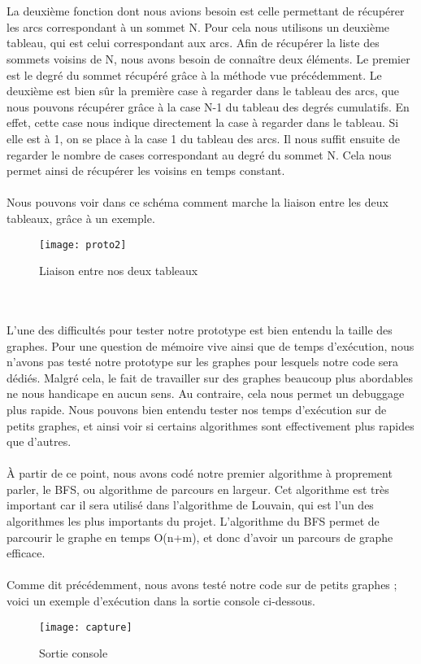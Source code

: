 \begin{titlepage}
{~\\ \\
	La deuxième fonction dont nous avions besoin est celle permettant de récupérer les arcs correspondant à un sommet N. Pour cela nous utilisons un deuxième tableau, qui est celui correspondant aux arcs. Afin de récupérer la liste des sommets voisins de N, nous avons besoin de connaître deux éléments. Le premier est le degré du sommet récupéré grâce à la méthode vue précédemment. Le deuxième est bien sûr la première case à regarder dans le tableau des arcs, que nous pouvons récupérer grâce à la case N-1 du tableau des degrés cumulatifs. En effet, cette case nous indique directement la case à regarder dans le tableau. Si elle est à 1, on se place à la case 1 du tableau des arcs. Il nous suffit ensuite de regarder le nombre de cases correspondant au degré du sommet N. Cela nous permet ainsi de récupérer les voisins en temps constant.
~\\ \\
	Nous pouvons voir dans ce schéma comment marche la liaison entre les deux tableaux, grâce à un exemple.
\begin{figure}[h]
\centering
\texttt{[image: proto2]}
\caption{Liaison entre nos deux tableaux}
\end{figure}
~\\ \\
	L'une des difficultés pour tester notre prototype est bien entendu la taille des graphes. Pour une question de mémoire vive ainsi que de temps d’exécution, nous n'avons pas testé notre prototype sur les graphes pour lesquels notre code sera dédiés. Malgré cela, le fait de travailler sur des graphes beaucoup plus abordables ne nous handicape en aucun sens. Au contraire, cela nous permet un debuggage plus rapide. Nous pouvons bien entendu tester nos temps d'exécution sur de petits graphes, et ainsi voir si certains algorithmes sont effectivement plus rapides que d'autres.
~\\ \\
	À partir de ce point, nous avons codé notre premier algorithme à proprement parler, le BFS, ou algorithme de parcours en largeur. Cet algorithme est très important car il sera utilisé dans l'algorithme de Louvain, qui est l'un des algorithmes les plus importants du projet. L'algorithme du BFS permet de parcourir le graphe en temps O(n+m), et donc d'avoir un parcours de graphe efficace. 
~\\ \\
	Comme dit précédemment, nous avons testé notre code sur de petits graphes ; voici un exemple d'exécution dans la sortie console ci-dessous.
\begin{figure}[h]
\centering
\texttt{[image: capture]}
\caption{Sortie console}
\end{figure}
\\ \\
}


\end{titlepage}

